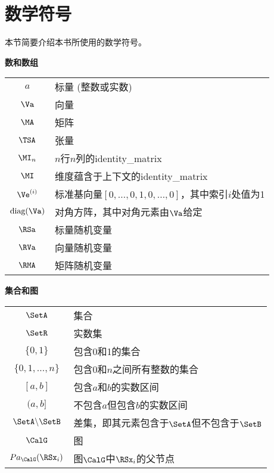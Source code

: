 \section*{数学符号}
\label{notation}



本节简要介绍本书所使用的数学符号。

\begin{minipage}{\textwidth}
\centerline{\bf 数和数组}
\bgroup
\def\arraystretch{1.5}
\begin{tabular}{cp{3.25in}}
$\displaystyle a$ & 标量 (整数或实数) \\
$\displaystyle \Va$ & 向量 \\
$\displaystyle \MA$ & 矩阵 \\
$\displaystyle \TSA$ & 张量 \\
$\displaystyle \MI_n$ & $n$行$n$列的\gls{identity_matrix} \\
    $\displaystyle \MI$ &  维度蕴含于上下文的\gls{identity_matrix} \\
$\displaystyle \Ve^{(i)}$ & 标准基向量$[0,\dots,0,1,0,\dots,0]$，其中索引$i$处值为1 \\
$\displaystyle \text{diag}(\Va)$ & 对角方阵，其中对角元素由$\Va$给定 \\
$\displaystyle \RSa$ & 标量随机变量 \\
$\displaystyle \RVa$ & 向量随机变量 \\
$\displaystyle \RMA$ & 矩阵随机变量 \\
\end{tabular}
\egroup
\end{minipage}

\iffalse

\vspace{\notationgap}
\begin{minipage}{\textwidth}
\centerline{\bf 集合和图}
\bgroup
\def\arraystretch{1.5}
\begin{tabular}{cp{3.25in}}
$\displaystyle \SetA$ & 集合 \\
$\displaystyle \SetR$ & 实数集 \\
$\displaystyle \{0, 1\}$ & 包含0和1的集合 \\
$\displaystyle \{0, 1, \dots, n \}$ & 包含$0$和$n$之间所有整数的集合 \\
$\displaystyle [a, b]$ & 包含$a$和$b$的实数区间 \\
$\displaystyle (a, b]$ & 不包含$a$但包含$b$的实数区间 \\
$\displaystyle \SetA \backslash \SetB$ & 差集，即其元素包含于$\SetA$但不包含于$\SetB$\\
$\displaystyle \CalG$ & 图 \\
$\displaystyle Pa_\CalG(\RSx_i)$ & 图$\CalG$中$\RSx_i$的父节点
\end{tabular}
\egroup
\end{minipage}

